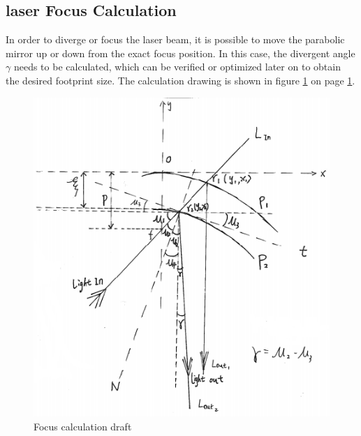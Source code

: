 \subsection{\ac{laser} Focus Calculation}
\label{focus}
In order to diverge or focus the laser beam, it is possible to move the parabolic mirror up or down from the exact focus position. In this case, the divergent angle $\gamma$ needs to be calculated, which can be verified or optimized later on to obtain the desired footprint size. The calculation drawing is shown in figure \ref{fig:focus} on page \ref{fig:focus}.

\begin{figure}[ht!]
\centering
\includegraphics[scale = 1.2]{chapters/img/focus.png}
\caption{Focus calculation draft}
\label{fig:focus}
\end{figure}

